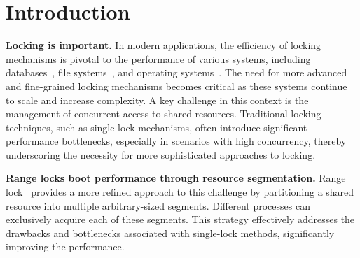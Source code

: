 
\chapter{Introduction}\label{chapter:introduction}


\textbf{Locking is important.}
In modern applications, the efficiency of locking mechanisms is pivotal to the performance of various systems, including databases~\parencite{lomet1993key, graefe2007hierarchical}, file systems~\parencite{lee2021concurrent, gao2023citron, lee2019write}, and operating systems~\parencite{readerWriterLocks2017, mmapSem2017}. 
The need for more advanced and fine-grained locking mechanisms becomes critical as these systems continue to scale and increase complexity. 
A key challenge in this context is the management of concurrent access to shared resources. Traditional locking techniques, such as single-lock mechanisms, often introduce significant performance bottlenecks, especially in scenarios with high concurrency, thereby underscoring the necessity for more sophisticated approaches to locking.

\textbf{Range locks boot performance through resource segmentation.} 
Range lock~\parencite{gao2023citron, kogan2020scalable} provides a more refined approach to this challenge by partitioning a shared resource into multiple arbitrary-sized segments. Different processes can exclusively acquire each of these segments. This strategy effectively addresses the drawbacks and bottlenecks associated with single-lock methods, significantly improving the performance.

